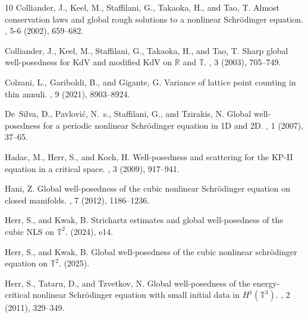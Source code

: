 \documentclass[12pt, letterpaper]{amsart}
\begin{document}
\begin{thebibliography}{10}
    {\sc Colliander, J., Keel, M., Staffilani, G., Takaoka, H., and Tao, T.}
    \newblock Almost conservation laws and global rough solutions to a nonlinear
      {S}chr\"{o}dinger equation.
    , 5-6 (2002), 659--682.
    
    {\sc Colliander, J., Keel, M., Staffilani, G., Takaoka, H., and Tao, T.}
    \newblock Sharp global well-posedness for {K}d{V} and modified {K}d{V} on
      {$\mathbb{R}$} and {$\mathbb{T}$}.
    , 3 (2003), 705--749.
    
    {\sc Colzani, L., Gariboldi, B., and Gigante, G.}
    \newblock Variance of lattice point counting in thin annuli.
    , 9 (2021), 8903--8924.
    
    {\sc De~Silva, D., Pavlovi\'c, N.~s., Staffilani, G., and Tzirakis, N.}
    \newblock Global well-posedness for a periodic nonlinear {S}chr\"odinger
      equation in 1{D} and 2{D}.
    , 1 (2007), 37--65.
    
    {\sc Hadac, M., Herr, S., and Koch, H.}
    \newblock Well-posedness and scattering for the {KP}-{II} equation in a
      critical space.
    , 3 (2009),
      917--941.
    
    {\sc Hani, Z.}
    \newblock Global well-posedness of the cubic nonlinear {S}chr\"{o}dinger
      equation on closed manifolds.
    , 7 (2012), 1186--1236.
    
    {\sc Herr, S., and Kwak, B.}
    \newblock Strichartz estimates and global well-posedness of the cubic {NLS} on
      $\mathbb{T}^{2}$.
     (2024), e14.
    
    {\sc Herr, S., and Kwak, B.}
    \newblock Global well-posedness of the cubic nonlinear schr{\" o}dinger
      equation on {$\mathbb{T}^2$}.
     (2025).
    
    {\sc Herr, S., Tataru, D., and Tzvetkov, N.}
    \newblock Global well-posedness of the energy-critical nonlinear
      {S}chr\"odinger equation with small initial data in {$H^1(\mathbb {T}^3)$}.
    , 2 (2011), 329--349.
    

\end{thebibliography}
\end{document}
